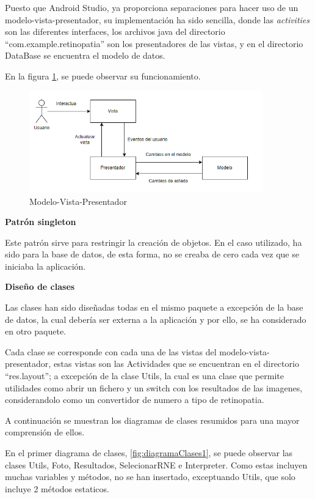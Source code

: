         Puesto que Android Studio, ya proporciona separaciones para hacer uso de un modelo-vista-presentador, su implementación ha sido sencilla, donde las \textit{activities} son las diferentes interfaces, los archivos java del directorio ``com.example.retinopatia'' son los presentadores de las vistas, y en el directorio DataBase se encuentra el modelo de datos.

        En la figura \ref{fig:modeloVistaPresentador}, se puede observar su funcionamiento.
        \begin{figure}[!ht]
                 \centering
                 \includegraphics[width=0.9\textwidth]{img/MVP.png}
                  \caption{Modelo-Vista-Presentador}
                 \label{fig:modeloVistaPresentador}
        \end{figure}

        
    \textbf{Patrón singleton}
    
        Este patrón sirve para restringir la creación de objetos. En el caso utilizado, ha sido para la base de datos, de esta forma, no se creaba de cero cada vez que se iniciaba la aplicación.

    \textbf{Diseño de clases}

    Las clases han sido diseñadas todas en el mismo paquete a excepción de la base de datos, la cual debería ser externa a la aplicación y por ello, se ha considerado en otro paquete.

    Cada clase se corresponde con cada una de las vistas del modelo-vista-presentador, estas vistas son las Actividades que se encuentran en el directorio ``res.layout''; a excepción de la clase Utils, la cual es una clase que permite utilidades como abrir un fichero y un switch con los resultados de las imagenes, considerandolo como un convertidor de numero a tipo de retinopatia.

    A continuación se muestran los diagramas de clases resumidos para una mayor comprensión de ellos.
    
    En el primer diagrama de clases, \ref{fig:diagramaClases1}, se puede observar las clases Utils, Foto, Resultados, SelecionarRNE e Interpreter. Como estas incluyen muchas variables y métodos, no se han insertado, exceptuando Utils, que solo incluye 2 métodos estaticos.

